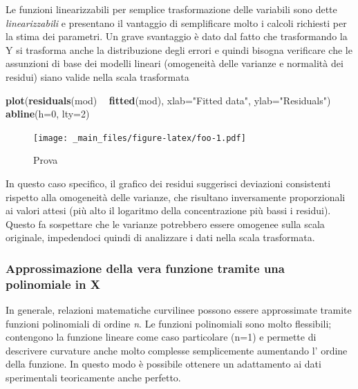 \documentclass[a4paper,12pt,oneside]{book}
\newenvironment{Shaded}{\begin{snugshade}}{\end{snugshade}}
\newcommand{\KeywordTok}[1]{\textcolor[rgb]{0.13,0.29,0.53}{\textbf{#1}}}
\newcommand{\DataTypeTok}[1]{\textcolor[rgb]{0.13,0.29,0.53}{#1}}
\newcommand{\DecValTok}[1]{\textcolor[rgb]{0.00,0.00,0.81}{#1}}
\newcommand{\StringTok}[1]{\textcolor[rgb]{0.31,0.60,0.02}{#1}}
\newcommand{\OperatorTok}[1]{\textcolor[rgb]{0.81,0.36,0.00}{\textbf{#1}}}
\newcommand{\NormalTok}[1]{#1}
\theoremstyle{definition}
\theoremstyle{definition}
\theoremstyle{definition}
\theoremstyle{remark}
\begin{document}
Le funzioni linearizzabili per semplice trasformazione delle variabili
sono dette \emph{linearizzabili} e presentano il vantaggio di
semplificare molto i calcoli richiesti per la stima dei parametri. Un
grave svantaggio è dato dal fatto che trasformando la Y si trasforma
anche la distribuzione degli errori e quindi bisogna verificare che le
assunzioni di base dei modelli lineari (omogeneità delle varianze e
normalità dei residui) siano valide nella scala trasformata

\begin{Shaded}
\begin{Highlighting}[]
\KeywordTok{plot}\NormalTok{(}\KeywordTok{residuals}\NormalTok{(mod) }\OperatorTok{~}\StringTok{ }\KeywordTok{fitted}\NormalTok{(mod), }
     \DataTypeTok{xlab=}\StringTok{"Fitted data"}\NormalTok{, }\DataTypeTok{ylab=}\StringTok{"Residuals"}\NormalTok{)}
\KeywordTok{abline}\NormalTok{(}\DataTypeTok{h=}\DecValTok{0}\NormalTok{, }\DataTypeTok{lty=}\DecValTok{2}\NormalTok{)}
\end{Highlighting}
\end{Shaded}

\begin{figure}
\centering
\texttt{[image: \_main\_files/figure-latex/foo-1.pdf]}
\caption{\label{fig:foo}Prova}
\end{figure}

In questo caso specifico, il grafico dei residui suggerisci deviazioni
consistenti rispetto alla omogeneità delle varianze, che risultano
inversamente proporzionali ai valori attesi (più alto il logaritmo della
concentrazione più bassi i residui). Questo fa sospettare che le
varianze potrebbero essere omogenee sulla scala originale, impedendoci
quindi di analizzare i dati nella scala trasformata.

\subsubsection{Approssimazione della vera funzione tramite una
polinomiale in
X}\label{approssimazione-della-vera-funzione-tramite-una-polinomiale-in-x}

In generale, relazioni matematiche curvilinee possono essere
approssimate tramite funzioni polinomiali di ordine \textit{n}. Le
funzioni polinomiali sono molto flessibili; contengono la funzione
lineare come caso particolare (n=1) e permette di descrivere curvature
anche molto complesse semplicemente aumentando l' ordine della funzione.
In questo modo è possibile ottenere un adattamento ai dati sperimentali
teoricamente anche perfetto.
\end{document}
